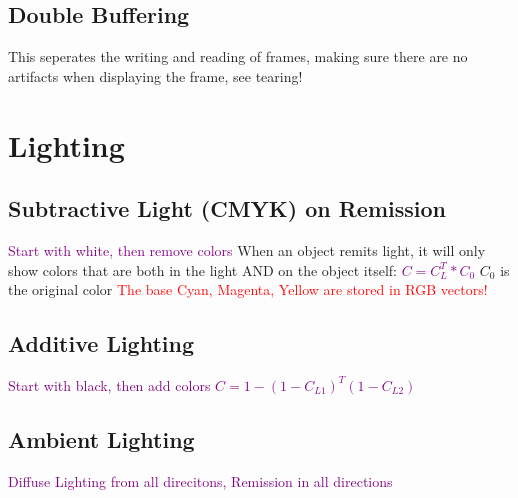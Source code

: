 \documentclass[main.tex,fontsize=12pt,paper=a4,paper=landscape,DIV=calc,]{scrartcl}
\begin{document}
\begin{multicols*}{4}
\subsection{Double Buffering}
This seperates the writing and reading of frames, making sure there are no artifacts when displaying the frame, see tearing!

\section{Lighting}
\subsection{Subtractive Light (CMYK) on Remission}
\textcolor{purple}{Start with white, then remove colors}\newline
When an object remits light, it will only show colors that are both in the light AND on the object itself:\newline
\textcolor{purple}{\(C = C_L^T * C_0\)}\newline
\(C_0\) is the original color\newline
\textcolor{red}{The base Cyan, Magenta, Yellow are stored in RGB vectors!}

\subsection{Additive Lighting}
\textcolor{purple}{Start with black, then add colors}\newline
\textcolor{purple}{\(C = 1 - (1 - C_{L1} )^T (1 - C_{L2} )\)}

\subsection{Ambient Lighting}
\textcolor{purple}{Diffuse Lighting from all direcitons, Remission in all directions}

\end{multicols*}
\end{document}
